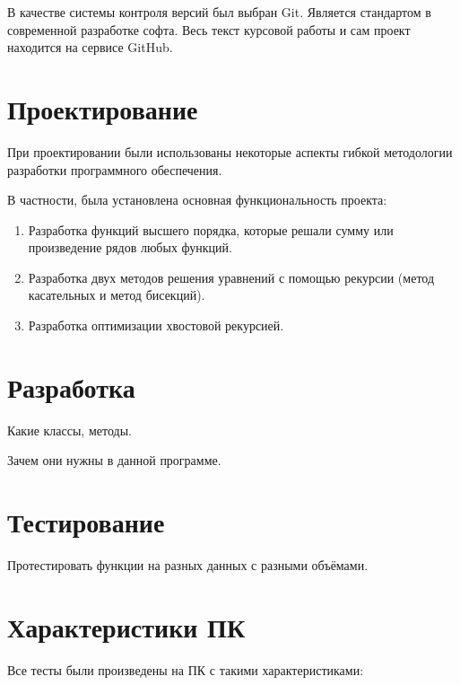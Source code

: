В качестве системы контроля версий был выбран Git.
Является стандартом в современной разработке софта.
Весь текст курсовой работы и сам проект находится на сервисе GitHub\cite{GitHub}.

\newpage
\section{Проектирование}

При проектировании были использованы некоторые аспекты гибкой методологии разработки программного обеспечения.

В частности, была установлена основная функциональность проекта:

\begin{enumerate}
	\item Разработка функций высшего порядка, которые решали сумму или произведение рядов любых функций.
	\item Разработка двух методов решения уравнений с помощью рекурсии (метод касательных и метод бисекций).
	\item Разработка оптимизации хвостовой рекурсией.
\end{enumerate}

\newpage
\section{Разработка}

Какие классы, методы.

Зачем они нужны в данной программе.

\newpage
\section{Тестирование}

Протестировать функции на разных данных с разными объёмами.

\newpage
\section{Характеристики ПК}

Все тесты были произведены на ПК с такими характеристиками:

